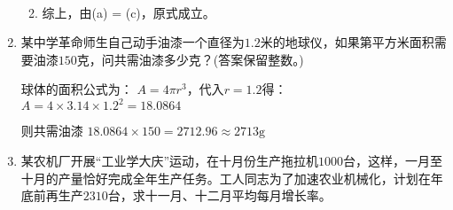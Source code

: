 \documentclass[answers]{exam}
\begin{document}
\begin{questions}
\begin{enumerate}[label=(\arabic*)]
\begin{solution}
\begin{enumerate}[label=\arabic*. ]
\begin{align*}
				            \end{align*}
				      \item 综上，由(a) = (c)，原式成立。
			      \end{enumerate}
		      \end{solution}
		\item
		      某中学革命师生自己动手油漆一个直径为$1.2$米的地球仪，如果第平方米面积需要油漆$150$克，问共需油漆多少克？(答案保留整数。)
		      \begin{solution}
			      球体的面积公式为： \( A = 4\pi r^3 \)，代入$r=1.2$得：
			      \begin{math}
				      A = 4\times 3.14 \times 1.2^2 = 18.0864
			      \end{math}

			      则共需油漆 \( 18.0864 \times 150 = 2712.96 \approx 2713 \text{g} \)
		      \end{solution}
		\item
		      某农机厂开展\enquote{工业学大庆}运动，在十月份生产拖拉机$1000$台，这样，一月至十月的产量恰好完成全年生产任务。工人同志为了加速农业机械化，计划在年底前再生产$2310$台，求十一月、十二月平均每月增长率。


\end{enumerate}
\end{questions}
\end{document}
